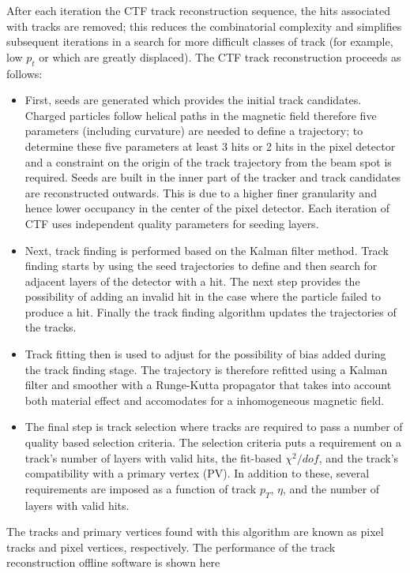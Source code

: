 After each iteration the CTF track reconstruction sequence, the hits
associated with tracks are removed; this reduces the combinatorial complexity
and simplifies subsequent iterations in a search for more difficult classes of track (for example,
low $p_{t}$ or which are greatly displaced).
The CTF track reconstruction proceeds as follows:
\begin{itemize}
\item First, seeds are generated which provides the initial track candidates.
Charged particles follow helical paths in the magnetic field therefore five parameters (including curvature)
are needed to define a trajectory; to determine these five parameters at least
3 hits or 2 hits in the pixel detector and a constraint on the origin of the track trajectory from the beam
spot is required. Seeds are built in the inner part of the tracker
and track candidates are reconstructed outwards. This is due to a higher finer granularity 
and hence lower occupancy in the center of the pixel detector. Each iteration of CTF
uses independent quality parameters for seeding layers. %
%
\item Next, track finding is performed based on the Kalman filter method. %
Track finding starts by using the seed trajectories to define and then search
for adjacent layers of the detector with a hit. The next step provides the possibility
of adding an invalid hit in the case where the particle failed to produce a hit.
Finally the track finding algorithm updates the trajectories of the tracks. 
\item Track fitting then is used to adjust for the possibility of bias added during the track
finding stage. The trajectory is therefore refitted using a Kalman filter and smoother with
a Runge-Kutta propagator that takes into account both material effect and accomodates
for a inhomogeneous magnetic field.
\item The final step is track selection where tracks are required to pass a number of quality
based selection criteria. 
The selection criteria puts a requirement on a track's number of layers %
with valid hits, the fit-based $\chi^{2}/dof$, and the track's compatibility
with a primary vertex (PV). In addition to these, several requirements are
imposed as a function of track $p_{T}$, $\eta$, and the number of layers
with valid hits. 
\end{itemize}
The tracks and primary vertices found with this algorithm are known as pixel 
tracks and pixel vertices, respectively. The performance of the track reconstruction
offline software is shown here %
